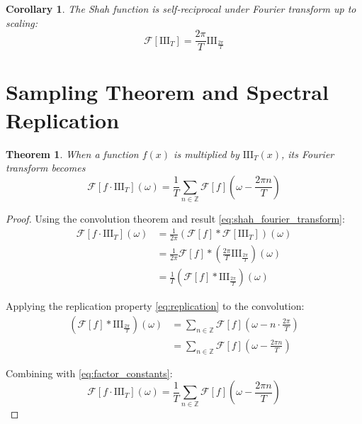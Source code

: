 \documentclass{article}
\newtheorem{theorem}{Theorem}
\newtheorem{corollary}{Corollary}
\begin{document}
\begin{corollary}
\label{cor:shah_self_reciprocal}
The Shah function is self-reciprocal under Fourier transform up to scaling:
\begin{equation}
\label{eq:self_reciprocal}
\mathcal{F}[\text{III}_T] = \frac{2\pi}{T} \text{III}_{\frac{2\pi}{T}}
\end{equation}
\end{corollary}

\section{Sampling Theorem and Spectral Replication}

\begin{theorem}
\label{thm:sampling_spectral}
When a function $f(x)$ is multiplied by $\text{III}_T(x)$, its Fourier transform becomes
\begin{equation}
\label{eq:sampling_spectrum}
\mathcal{F}[f \cdot \text{III}_T](\omega) = \frac{1}{T} \sum_{n \in \mathbb{Z}} \mathcal{F}[f]\left(\omega - \frac{2\pi n}{T}\right)
\end{equation}
\end{theorem}

\begin{proof}
Using the convolution theorem and result \eqref{eq:shah_fourier_transform}:
\begin{align}
\mathcal{F}[f \cdot \text{III}_T](\omega) &= \frac{1}{2\pi} (\mathcal{F}[f] * \mathcal{F}[\text{III}_T])(\omega) \label{eq:convolution_theorem}\\
&= \frac{1}{2\pi} \mathcal{F}[f] * \left(\frac{2\pi}{T} \text{III}_{\frac{2\pi}{T}}\right)(\omega) \label{eq:substitute_shah_fourier}\\
&= \frac{1}{T} (\mathcal{F}[f] * \text{III}_{\frac{2\pi}{T}})(\omega) \label{eq:factor_constants}
\end{align}

Applying the replication property \eqref{eq:replication} to the convolution:
\begin{align}
(\mathcal{F}[f] * \text{III}_{\frac{2\pi}{T}})(\omega) &= \sum_{n \in \mathbb{Z}} \mathcal{F}[f]\left(\omega - n \cdot \frac{2\pi}{T}\right) \label{eq:replication_applied}\\
&= \sum_{n \in \mathbb{Z}} \mathcal{F}[f]\left(\omega - \frac{2\pi n}{T}\right) \label{eq:index_order}
\end{align}

Combining with \eqref{eq:factor_constants}:
\begin{equation}
\label{eq:final_sampling_spectrum}
\mathcal{F}[f \cdot \text{III}_T](\omega) = \frac{1}{T} \sum_{n \in \mathbb{Z}} \mathcal{F}[f]\left(\omega - \frac{2\pi n}{T}\right)
\end{equation}
\end{proof}
\end{document}
